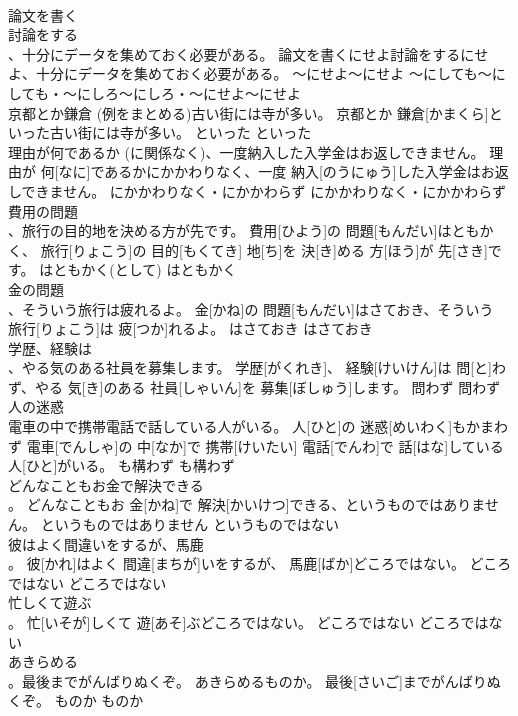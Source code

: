 \documentclass[8pt]{extreport}
\begin{document}
\begin{CJK}{UTF8}{min}
\\	論文を書く 
\\	討論をする 
\\	、十分にデータを集めておく必要がある。	論文を書くにせよ討論をするにせよ、十分にデータを集めておく必要がある。	～にせよ～にせよ	～にしても～にしても・～にしろ～にしろ・～にせよ～にせよ	
\\	京都とか鎌倉 (例をまとめる)古い街には寺が多い。	京都とか 鎌倉[かまくら]といった古い街には寺が多い。	といった	といった	
\\	理由が何であるか (に関係なく)、一度納入した入学金はお返しできません。	理由が 何[なに]であるかにかかわりなく、一度 納入[のうにゅう]した入学金はお返しできません。	にかかわりなく・にかかわらず	にかかわりなく・にかかわらず	
\\	費用の問題 
\\	、旅行の目的地を決める方が先です。	費用[ひよう]の 問題[もんだい]はともかく、 旅行[りょこう]の 目的[もくてき] 地[ち]を 決[き]める 方[ほう]が 先[さき]です。	はともかく(として)	はともかく	
\\	金の問題 
\\	、そういう旅行は疲れるよ。	金[かね]の 問題[もんだい]はさておき、そういう 旅行[りょこう]は 疲[つか]れるよ。	はさておき	はさておき	
\\	学歴、経験は 
\\	、やる気のある社員を募集します。	学歴[がくれき]、 経験[けいけん]は 問[と]わず、やる 気[き]のある 社員[しゃいん]を 募集[ぼしゅう]します。	問わず	問わず	
\\	人の迷惑 
\\	電車の中で携帯電話で話している人がいる。	人[ひと]の 迷惑[めいわく]もかまわず 電車[でんしゃ]の 中[なか]で 携帯[けいたい] 電話[でんわ]で 話[はな]している 人[ひと]がいる。	も構わず	も構わず	
\\	どんなこともお金で解決できる 
\\	。	どんなこともお 金[かね]で 解決[かいけつ]できる、というものではありません。	というものではありません	というものではない	
\\	彼はよく間違いをするが、馬鹿 
\\	。	彼[かれ]はよく 間違[まちが]いをするが、 馬鹿[ばか]どころではない。	どころではない	どころではない	
\\	忙しくて遊ぶ 
\\	。	忙[いそが]しくて 遊[あそ]ぶどころではない。	どころではない	どころではない	
\\	あきらめる 
\\	。最後までがんばりぬくぞ。	あきらめるものか。 最後[さいご]までがんばりぬくぞ。	ものか	ものか	

\end{CJK}
\end{document}
